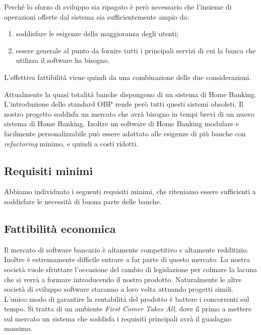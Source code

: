 \documentclass[10pt]{softeng} %
\begin{document}
Perch\'e lo sforzo di sviluppo sia ripagato \`e per\`o necessario che l'insieme di operazioni offerte dal sistema sia sufficientemente ampio da:
\begin{enumerate}
	\item soddisfare le esigenze della maggioranza degli utenti;
	\item essere generale al punto da fornire tutti i principali servizi di cui la banca che utilizza il software ha bisogno.
\end{enumerate}
L'effettiva fattibilit\`a viene quindi da una combinazione delle due considerazioni.

Attualmente la quasi totalit\`a banche dispongono di un sistema di Home Banking.
L'introduzione dello standard OBP rende per\`o tutti questi sistemi obsoleti.
Il nostro progetto soddisfa un mercato che avr\`a bisogno in tempi brevi di un nuovo sistema di Home Banking.
Inoltre un software di Home Banking modulare e facilmente personalizzabile pu\`o essere adattato alle esigenze di pi\`u banche con \emph{refactoring} minimo, e quindi a costi ridotti.

\subsection{Requisiti minimi}

Abbiamo individuato i seguenti requisiti minimi, che riteniamo essere sufficienti a soddisfare le necessit\`a di buona parte delle banche.


\subsection{Fattibilit\`a economica}

Il mercato di software bancario \`e altamente competitivo e altamente redditizio.
Inoltre \`e estremamente difficile entrare a far parte di questo mercato.
La nostra societ\`a vuole sfruttare l'occasione del cambio di legislazione per colmare la lacuna che si verr\`a a formare introducendo il nostro prodotto.
Naturalmente le altre societ\`a di sviluppo software staranno a loro volta attuando progetti simili.
L'unico modo di garantire la rentabilit\`a del prodotto \`e battere i concorrenti sul tempo.
Si tratta di un ambiente \emph{First Comer Takes All}, dove il primo a mettere sul mercato un sistema che soddisfa i requisiti principali avr\`a il guadagno massimo.
\end{document}
